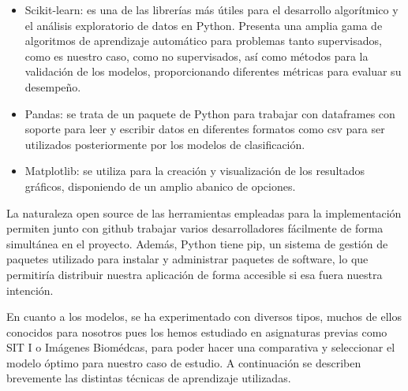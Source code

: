 \documentclass{article}
\begin{document}
\begin{itemize}
\item
Scikit-learn\cite{scikit-learn}: es una de las librerías más útiles para el desarrollo
algorítmico y el análisis exploratorio de datos en Python. Presenta
una amplia gama de algoritmos de aprendizaje automático para problemas
tanto supervisados, como es nuestro caso, como no supervisados, así
como métodos para la validación de los modelos, proporcionando
diferentes métricas para evaluar su desempeño.\cite{wijnhoven2019}

\item
Pandas: se trata de un paquete de Python para trabajar con dataframes
con soporte para leer y escribir datos en diferentes formatos como csv
para ser utilizados posteriormente por los modelos de clasificación.\cite{pandas}


\item
Matplotlib: se utiliza para la creación y visualización de los
		resultados gráficos, disponiendo de un amplio abanico
		de opciones.\cite{mpl}

\end{itemize}

La naturaleza open source de las herramientas empleadas para la
implementación permiten junto con github trabajar varios
desarrolladores fácilmente de forma simultánea en el proyecto.
Además, Python tiene pip, un sistema de gestión de paquetes utilizado
para instalar y administrar paquetes de software, lo que permitiría
distribuir nuestra aplicación de forma accesible si esa fuera nuestra
intención.

En cuanto a los modelos, se ha experimentado con diversos tipos,
muchos de ellos conocidos para nosotros pues los hemos estudiado en
asignaturas previas como SIT I o Imágenes Biomédcas, para poder hacer
una comparativa y seleccionar el modelo óptimo para nuestro caso de
estudio. A continuación se describen brevemente las distintas técnicas
de aprendizaje utilizadas.
\end{document}
